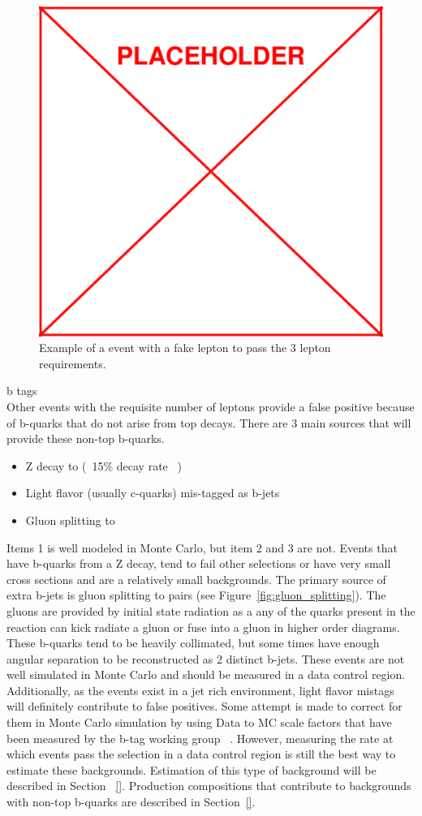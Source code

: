 			\begin{figure}[h]
\begin{center}
\includegraphics[width=0.48\linewidth]{Figs/placeholder.pdf}
\caption{\label{fig:tt_w_fake}
Example of a \ttbar event with a fake lepton to pass the 3 lepton requirements.
}
\end{center}
\end{figure} 

b tags \\
Other events with the requisite number of leptons provide a false positive because of b-quarks that do not arise from top decays. There are 3 main sources that will provide these non-top b-quarks.
\begin{itemize}
\item Z decay to \bbbar (~15\% decay rate ~\cite{pdg})
\item Light flavor (usually c-quarks) mis-tagged as b-jets
\item Gluon splitting to \bbbar
\end{itemize}

Items 1 is well modeled in Monte Carlo, but item 2 and 3 are not. Events that have b-quarks from a Z decay, tend to fail other selections or have very small cross sections and are a relatively small backgrounds. The primary source of extra b-jets is gluon splitting to \bbbar pairs (see Figure~\ref{fig:gluon_splitting}). The gluons are provided by initial state radiation as a any of the quarks present in the reaction can kick radiate a gluon or fuse into a gluon in higher order diagrams. These b-quarks tend to be heavily collimated, but some times have enough angular separation to be reconstructed as 2 distinct b-jets. These events are not well simulated in Monte Carlo and should be measured in a data control region. Additionally, as the \ttZ events exist in a jet rich environment, light flavor mistags will definitely contribute to false positives. Some attempt is made to correct for them in Monte Carlo simulation by using Data to MC scale factors that have been measured by the b-tag working group ~\cite{}. However, measuring the rate at which events pass the selection in a data control region is still the best way to estimate these backgrounds. Estimation of this type of background will be described in Section ~\ref{}. Production compositions that contribute to backgrounds with non-top b-quarks are described in Section~\ref{}.\\


